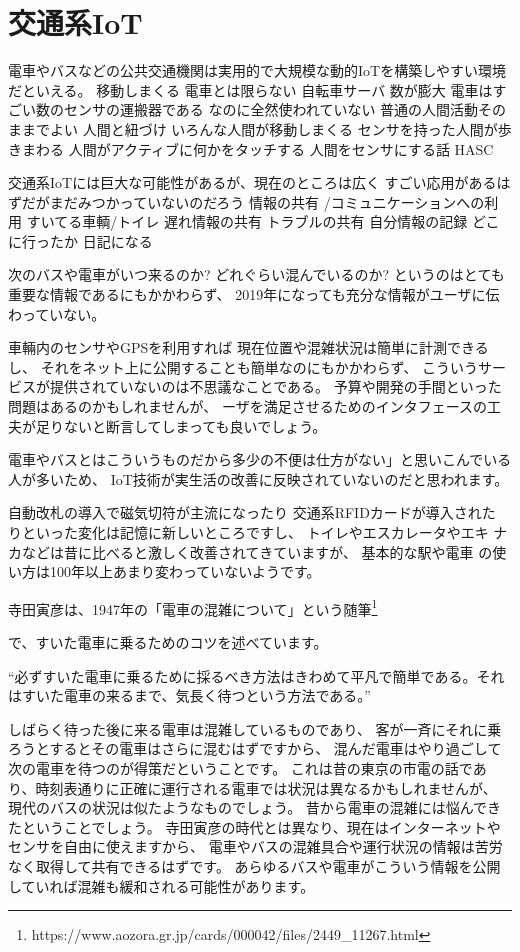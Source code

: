 \documentclass[twocolumn,10pt]{jarticle}
\begin{document}
\section{交通系IoT}
  
電車やバスなどの公共交通機関は実用的で大規模な動的IoTを構築しやすい環境だといえる。
移動しまくる
電車とは限らない
自転車サーバ
数が膨大
電車はすごい数のセンサの運搬器である
なのに全然使われていない
普通の人間活動そのままでよい
人間と紐づけ
いろんな人間が移動しまくる
センサを持った人間が歩きまわる
人間がアクティブに何かをタッチする
人間をセンサにする話
HASC

交通系IoTには巨大な可能性があるが、現在のところは広く
すごい応用があるはずだがまだみつかっていないのだろう
情報の共有 /コミュニケーションへの利用
すいてる車輌/トイレ
遅れ情報の共有
トラブルの共有
自分情報の記録
どこに行ったか
日記になる

次のバスや電車がいつ来るのか? どれぐらい混んでいるのか?
というのはとても重要な情報であるにもかかわらず、
2019年になっても充分な情報がユーザに伝わっていない。


車輛内のセンサやGPSを利用すれば
現在位置や混雑状況は簡単に計測できるし、
それをネット上に公開することも簡単なのにもかかわらず、
こういうサービスが提供されていないのは不思議なことである。
予算や開発の手間といった問題はあるのかもしれませんが、
ーザを満足させるためのインタフェースの工夫が足りないと断言してしまっても良いでしょう。

電車やバスとはこういうものだから多少の不便は仕方がない」と思いこんでいる人が多いため、
IoT技術が実生活の改善に反映されていないのだと思われます。
  
自動改札の導入で磁気切符が主流になったり 交通系RFIDカードが導入された
りといった変化は記憶に新しいところですし、 トイレやエスカレータやエキ
ナカなどは昔に比べると激しく改善されてきていますが、 基本的な駅や電車
の使い方は100年以上あまり変わっていないようです。

寺田寅彦は、1947年の「電車の混雑について」という随筆\footnote{
  \small{\textsf{https://www.aozora.gr.jp/cards/000042/files/2449\_11267.html}}
}

で、すいた電車に乗るためのコツを述べています。

``必ずすいた電車に乗るために採るべき方法はきわめて平凡で簡単である。それはすいた電車の来るまで、気長く待つという方法である。''

  しばらく待った後に来る電車は混雑しているものであり、 客が一斉にそれに乗ろうとするとその電車はさらに混むはずですから、 混んだ電車はやり過ごして次の電車を待つのが得策だということです。 これは昔の東京の市電の話であり、時刻表通りに正確に運行される電車では状況は異なるかもしれませんが、 現代のバスの状況は似たようなものでしょう。 昔から電車の混雑には悩んできたということでしょう。
  寺田寅彦の時代とは異なり、現在はインターネットやセンサを自由に使えますから、 電車やバスの混雑具合や運行状況の情報は苦労なく取得して共有できるはずです。 あらゆるバスや電車がこういう情報を公開していれば混雑も緩和される可能性があります。
\end{document}
